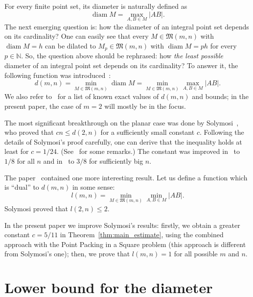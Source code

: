 \documentclass[a4paper,14pt]{article} %
\theoremstyle{plain}
\theoremstyle{definition}
\begin{document}
For every finite point set, its diameter is naturally defined as
\begin{equation}
	\operatorname{diam} M = \max_{A,B\in M} |AB|
	.
\end{equation}
The next emerging question is: how the diameter of an integral point set depends on its cardinality?
One can easily see that every $M\in\mathfrak{M}(m,n)$ with $\operatorname{diam} M = h$
can be dilated to $M_p\in\mathfrak{M}(m,n)$ with $\operatorname{diam} M = ph$
for every $p\in\mathbb{N}$.
So, the question above should be rephrased:
how \textit{the least possible} diameter of an integral point set depends on its cardinality?
To answer it, the following function was introduced~\cite{kurz2008bounds,kurz2008minimum}:
\begin{equation}
	d(m,n) = \min_{M\in\mathfrak{M}(m,n)} \operatorname{diam} M = \min_{M\in\mathfrak{M}(m,n)} \max_{A,B\in M} |AB|
	.
\end{equation}
We also refer to~\cite{kurz2008bounds} for a list of known exact values of $d(m,n)$
and bounds; in the present paper, the case of $m=2$ will mostly be in the focus.

The most significant breakthrough on the planar case was done by Solymosi~\cite{solymosi2003note},
who proved that $cn \leq d(2,n)$ for a sufficiently small constant $c$.
Following the details of Solymosi's proof carefully,
one can derive that the inequality holds at least for $c = 1/24$.
(See~\cite[Exercise 2.6]{garibaldi2005erdos} for some remarks.)
The constant was improved in~\cite{our-mz-rus} to $1/8$ for all $n$ and in~\cite{our-vmmsh-2018}
to $3/8$ for sufficiently big $n$.

The paper~\cite{solymosi2003note} contained one more interesting result.
Let us define a function which is ``dual'' to $d(m,n)$ in some sense:
\begin{equation}
	l(m,n) = \min_{M\in\mathfrak{M}(m,n)} \min_{A,B\in M} |AB|
	.
\end{equation}
Solymosi proved that $l(2,n)\leq 2$.

In the present paper we improve Solymosi's results:
firstly, we obtain a greater constant $c = 5/11$ in Theorem~\ref{thm:main_estimate},
using the combined approach with the Point Packing in a Square problem
(this approach is different from Solymosi's one);
then, we prove that $l(m,n)=1$ for all possible $m$ and $n$.

\section{Lower bound for the diameter}
\end{document}
